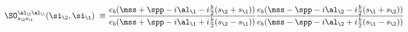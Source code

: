 \begin{equation}
\SO^{\al_\2\al_\1}_{s_\2s_\1}(\si_\2,\si_\1)\;\equiv
\frac{e_b(\mss+\spp-i\al_\1-i\frac{b}{2}(s_\2+s_\1))}
{e_b(\mss+\spp-i\al_\1+i\frac{b}{2}(s_\2-s_\1))}
\frac{e_b(\mss-\spp-i\al_\2-i\frac{b}{2}(s_\1+s_\2))}
{e_b(\mss-\spp-i\al_\2+i\frac{b}{2}(s_\1-s_\2))}
\end{equation}

